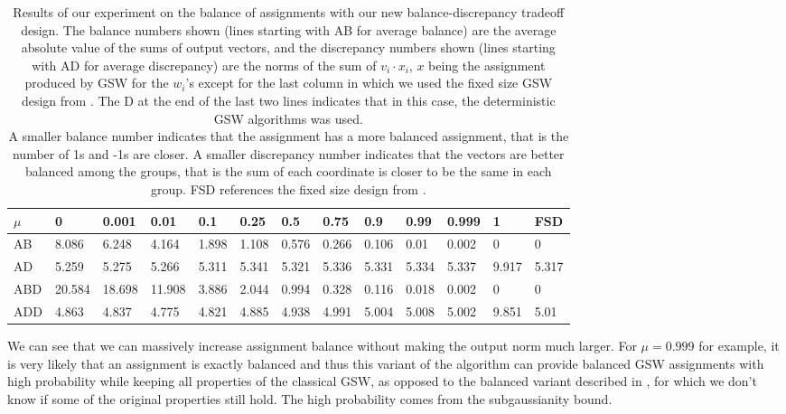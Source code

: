 \documentclass[12pt]{article}
\begin{document}
\begin{center}
\begin{table}[h]
\begin{tabular}{l|llllllllllll}
 $\mu$ &0&0.001&0.01&0.1&0.25&0.5&0.75&0.9&0.99&0.999&1&FSD \cite{harshaw2019balancing}\\
\hline
AB&8.086&6.248&4.164&1.898&1.108&0.576&0.266&0.106&0.01&0.002&0&0 \\
AD&5.259&5.275&5.266&5.311&5.341&5.321&5.336&5.331&5.334&5.337&9.917&5.317\\
ABD&20.584&18.698&11.908&3.886&2.044&0.994&0.328&0.116&0.018&0.002&0&0\\
ADD&4.863&4.837&4.775&4.821&4.885&4.938&4.991&5.004&5.008&5.002&9.851&5.01
\end{tabular}
\caption{Results of our experiment on the balance of assignments with our new balance-discrepancy tradeoff design. The balance numbers shown (lines starting with AB for average balance) are the average absolute value of the sums of output vectors, and the discrepancy numbers shown (lines starting with AD for average discrepancy) are the norms of the sum of $v_i\cdot x_i$, $x$ being the assignment produced by GSW for the $w_i$'s except for the last column in which we used the fixed size GSW design from \cite{harshaw2019balancing}. The D at the end of the last two lines indicates that in this case, the deterministic GSW algorithms was used. \\A smaller balance number indicates that the assignment has a more balanced assignment, that is the number of 1s and -1s are closer. A smaller discrepancy number indicates that the vectors are better balanced among the groups, that is the sum of each coordinate is closer to be the same in each group. FSD \cite{harshaw2019balancing} references the fixed size design from \cite{harshaw2019balancing}.}
\label{balance_tradeoff_results}
\end{table}
\end{center}

We can see that we can massively increase assignment balance without making the output norm much larger. For $\mu=0.999$ for example, it is very likely that an assignment is exactly balanced and thus this variant of the algorithm can provide balanced GSW assignments with high probability while keeping all properties of the classical GSW, as opposed to the balanced variant described in \cite{harshaw2019balancing}, for which we don't know if some of the original properties still hold. The high probability comes from the subgaussianity bound.
\end{document}
